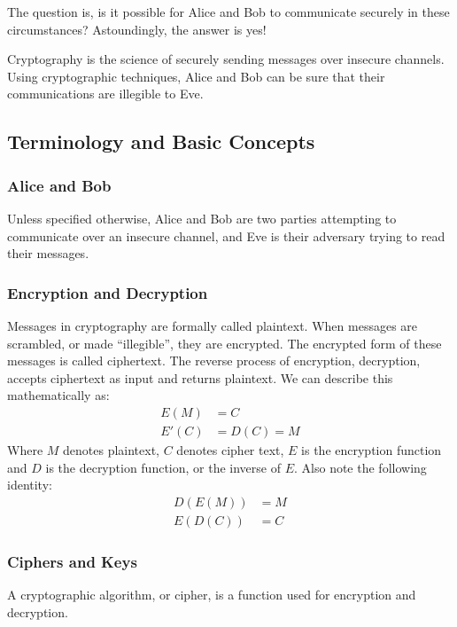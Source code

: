 \documentclass[12pt, a4paper, final]{report}
\begin{document}
The question is, is it possible for Alice and Bob to communicate securely
in these circumstances? Astoundingly, the answer is yes!

Cryptography is the science of securely sending messages over insecure
channels. Using cryptographic techniques, Alice and Bob can be sure that
their communications are illegible to Eve.

\subsection{Terminology and Basic Concepts}

\subsubsection{Alice and Bob}
Unless specified otherwise, Alice and Bob are two parties attempting to
communicate over an insecure channel, and Eve is their adversary trying to
read their messages.

\subsubsection{Encryption and Decryption}

Messages in cryptography are formally called plaintext. When messages are
scrambled, or made ``illegible'', they are encrypted. The encrypted form
of these messages is called ciphertext. The reverse process of encryption,
decryption, accepts ciphertext as input and returns plaintext. We can
describe this mathematically as:
\begin{align*}
    E(M) & = C\\
    E'(C) & = D(C) = M
\end{align*}
Where $M$ denotes plaintext, $C$ denotes cipher text, $E$ is the encryption
function and $D$ is the decryption function, or the inverse of $E$. Also
note the following identity:
\begin{align*}
    D(E(M)) & = M\\
    E(D(C)) & = C
\end{align*}

\subsubsection{Ciphers and Keys}

A cryptographic algorithm, or cipher, is a function used for encryption
and decryption.
\end{document}
